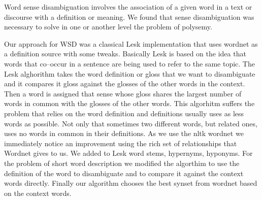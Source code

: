 Word sense disambiguation involves the association of a given word in a text or discourse with a definition or meaning.
We found that sense disambiguation was necessary to solve in one or another level the problem of polysemy.

Our approach for WSD was a classical Lesk\cite{LESK} implementation that uses wordnet as a definition source with some tweaks.
Basically Lesk is based on the idea that words that co–occur in a sentence are being used to refer to the same topic.
The Lesk alghorithm takes the word definition or gloss that we want to disambiguate and it compares it gloss against the glosses of the other words in the context.
Then a word is assigned that sense whose gloss shares the largest number of words in common with the glosses of the other words.
This algorhitm suffers the problem that relies on the word definition and definitions usually uses as less words as possible.
Not only that sometimes two different words, but related ones, uses no words in common in their definitions.
As we use the nltk wordnet we immediately notice an improvement using the rich set of relationships that Wordnet gives to us.
We added to Lesk word stems, hypernyms, hyponyms.
For the problem of short word description we modified the algorthim to use the definition of the word to disambiguate and to compare it against the context words directly.
Finally our algorithm chooses the best synset from wordnet based on the context words.
